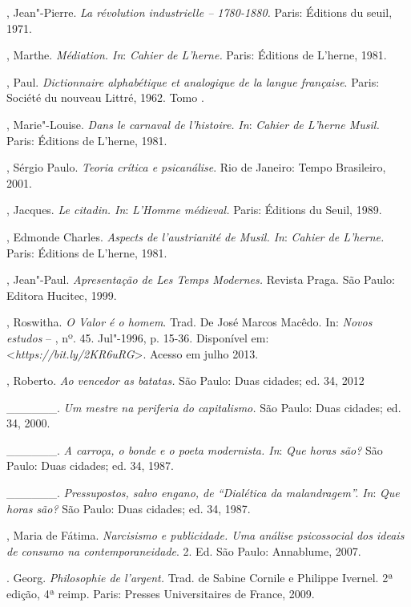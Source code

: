 \begin{Parskip}
, Jean"-Pierre. \emph{La révolution industrielle -- 1780-1880.}
Paris: Éditions du seuil, 1971.

, Marthe. \emph{Médiation. In}: \emph{Cahier de L'herne.} Paris:
Éditions de L'herne, 1981.

, Paul. \emph{Dictionnaire alphabétique et analogique de la
langue française}. Paris: Société du nouveau Littré, 1962. Tomo .

, Marie"-Louise. \emph{Dans le carnaval de l'histoire.} \emph{In}:
\emph{Cahier de L'herne Musil.} Paris: Éditions de L'herne, 1981.

, Sérgio Paulo. \emph{Teoria crítica e psicanálise}. Rio de
Janeiro: Tempo Brasileiro, 2001.

, Jacques. \emph{Le citadin. In}: \emph{L'Homme médieval.}
Paris: Éditions du Seuil, 1989.

, Edmonde Charles. \emph{Aspects de l'austrianité de Musil. In}:
\emph{Cahier de L'herne.} Paris: Éditions de L'herne, 1981.

, Jean"-Paul. \emph{Apresentação de Les Temps Modernes.} Revista
Praga. São Paulo: Editora Hucitec, 1999.

, Roswitha. \emph{O Valor é o homem}. Trad. De José Marcos
Macêdo. In: \emph{Novos estudos} -- , nº. 45. Jul"-1996, p.
15-36. Disponível em: \textless{}\emph{https://bit.ly/2KR6uRG}\textgreater{}. Acesso em julho 2013.

, Roberto. \emph{Ao vencedor as batatas.} São Paulo: Duas
cidades; ed. 34, 2012

\_\_\_\_\_\_. \emph{Um mestre na periferia do capitalismo.} São Paulo:
Duas cidades; ed. 34, 2000.

\_\_\_\_\_\_. \emph{A carroça, o bonde e o poeta modernista. In}:
\emph{Que horas são?} São Paulo: Duas cidades; ed. 34, 1987.

\_\_\_\_\_\_. \emph{Pressupostos, salvo engano, de ``Dialética da
malandragem''. In}: \emph{Que horas são?} São Paulo: Duas cidades; ed. 34, 1987.

, Maria de Fátima. \emph{Narcisismo e publicidade. Uma
análise psicossocial dos ideais de consumo na contemporaneidade}. 2. Ed.
São Paulo: Annablume, 2007.

. Georg. \emph{Philosophie de l'argent.} Trad. de Sabine Cornile
e Philippe Ivernel. 2ª edição, 4ª reimp. Paris: Presses Universitaires
de France, 2009.


\end{Parskip}
